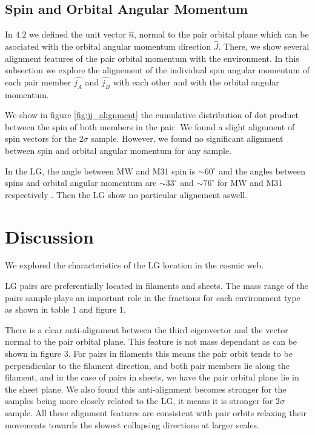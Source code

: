 \documentclass{emulateapj}
\begin{document}
\subsection{Spin and Orbital Angular Momentum}

In $4.2$ we defined the unit vector $\hat{n}$, normal to the pair 
orbital plane which can be asociated with the orbital angular 
momentum direction $\hat{J}$.
There, we show several alignment features of the pair orbital
momentum with the environment.
In this subsection we explore the alignement of the individual spin
angular momentum of each pair member $\hat{j_A}$ and $\hat{j_B}$ with
each other and with the orbital angular momentum.

We show in figure \ref{fig:jj_alignment} the cumulative distribution of
dot product between the spin of both members in the pair.
We found a slight alignment of spin vectors for the $2\sigma$ sample.
However, we found no significant alignment between spin and orbital angular 
momentum for any sample.

In the LG, the angle between MW and M31 spin is $\sim60^{\circ}$ and the
angles between spins and orbital angular momentum are $\sim33^{\circ}$
and $\sim76^{\circ}$ for MW and M31 respectively \citep{2012ApJ...753....9V}.
Then the LG show no particular alignement aswell. 

\section{Discussion}
\label{sec:discussion}

We explored the characteristics of the LG location in the cosmic web.

LG pairs are preferentially located in filaments and sheets. The mass range
of the pairs sample plays an important role in the fractions for each environment
type as shown in table $1$ and figure $1$.

There is a clear anti-alignment between the third eigenvector and the vector normal 
to the pair orbital plane. This feature is not mass dependant as can be shown in
figure $3$.
For pairs in filaments this means the pair orbit tends to be perpendicular to the 
filament direction, and both pair members lie along the filament, and in the case 
of pairs in sheets, we have the pair orbital plane lie in the sheet plane.
We also found this anti-alignment becomes stronger for the samples being more 
closely related to the LG, it means it is stronger for $2\sigma$ sample.
All these alignment features are consistent with pair orbits relaxing their 
movements towards the slowest collapsing directions at larger scales.
\end{document}
